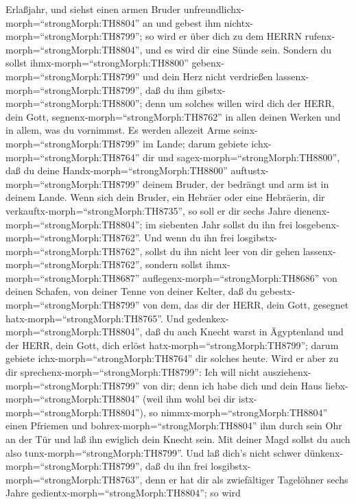 Erlaßjahr, und siehst einen armen Bruder
unfreundlichx-morph=``strongMorph:TH8804'' an und gebest ihm
nichtx-morph=``strongMorph:TH8799''; so wird er über dich zu dem HERRN
rufenx-morph=``strongMorph:TH8804'', und es wird dir eine Sünde sein.
 Sondern du sollst ihmx-morph=``strongMorph:TH8800''
gebenx-morph=``strongMorph:TH8799'' und dein Herz nicht verdrießen
lassenx-morph=``strongMorph:TH8799'', daß du ihm
gibstx-morph=``strongMorph:TH8800''; denn um solches willen wird dich
der HERR, dein Gott, segnenx-morph=``strongMorph:TH8762'' in allen
deinen Werken und in allem, was du vornimmst.  Es werden
allezeit Arme seinx-morph=``strongMorph:TH8799'' im Lande; darum gebiete
ichx-morph=``strongMorph:TH8764'' dir und
sagex-morph=``strongMorph:TH8800'', daß du deine
Handx-morph=``strongMorph:TH8800'' auftustx-morph=``strongMorph:TH8799''
deinem Bruder, der bedrängt und arm ist in deinem Lande. 
Wenn sich dein Bruder, ein Hebräer oder eine Hebräerin, dir
verkauftx-morph=``strongMorph:TH8735'', so soll er dir sechs Jahre
dienenx-morph=``strongMorph:TH8804''; im siebenten Jahr sollst du ihn
frei losgebenx-morph=``strongMorph:TH8762''.  Und wenn du
ihn frei losgibstx-morph=``strongMorph:TH8762'', sollst du ihn nicht
leer von dir gehen lassenx-morph=``strongMorph:TH8762'', 
sondern sollst ihmx-morph=``strongMorph:TH8687''
auflegenx-morph=``strongMorph:TH8686'' von deinen Schafen, von deiner
Tenne von deiner Kelter, daß du gebestx-morph=``strongMorph:TH8799'' von
dem, das dir der HERR, dein Gott, gesegnet
hatx-morph=``strongMorph:TH8765''.  Und
gedenkex-morph=``strongMorph:TH8804'', daß du auch Knecht warst in
Ägyptenland und der HERR, dein Gott, dich erlöst
hatx-morph=``strongMorph:TH8799''; darum gebiete
ichx-morph=``strongMorph:TH8764'' dir solches heute.  Wird
er aber zu dir sprechenx-morph=``strongMorph:TH8799'': Ich will nicht
ausziehenx-morph=``strongMorph:TH8799'' von dir; denn ich habe dich und
dein Haus liebx-morph=``strongMorph:TH8804'' (weil ihm wohl bei dir
istx-morph=``strongMorph:TH8804''),  so
nimmx-morph=``strongMorph:TH8804'' einen Pfriemen und
bohrex-morph=``strongMorph:TH8804'' ihm durch sein Ohr an der Tür und
laß ihn ewiglich dein Knecht sein. Mit deiner Magd sollst du auch also
tunx-morph=``strongMorph:TH8799''.  Und laß dich's nicht
schwer dünkenx-morph=``strongMorph:TH8799'', daß du ihn frei
losgibstx-morph=``strongMorph:TH8763'', denn er hat dir als zwiefältiger
Tagelöhner sechs Jahre gedientx-morph=``strongMorph:TH8804''; so wird

